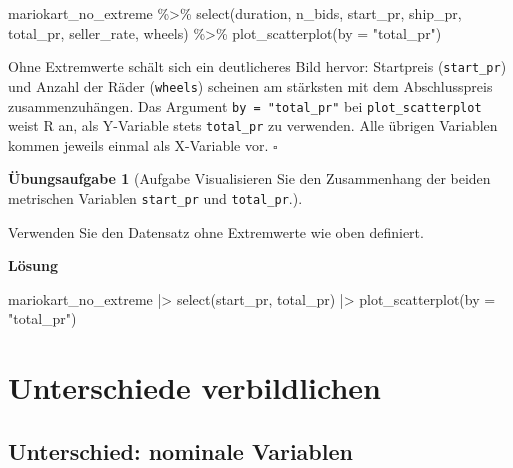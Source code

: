 \documentclass[
  letterpaper,
]{scrbook}
\newenvironment{Shaded}{\begin{snugshade}}{\end{snugshade}}
\newcommand{\AttributeTok}[1]{\textcolor[rgb]{0.40,0.45,0.13}{#1}}
\newcommand{\FunctionTok}[1]{\textcolor[rgb]{0.28,0.35,0.67}{#1}}
\newcommand{\NormalTok}[1]{\textcolor[rgb]{0.00,0.23,0.31}{#1}}
\newcommand{\SpecialCharTok}[1]{\textcolor[rgb]{0.37,0.37,0.37}{#1}}
\newcommand{\StringTok}[1]{\textcolor[rgb]{0.13,0.47,0.30}{#1}}
\theoremstyle{definition}
\newtheorem{exercise}{Übungsaufgabe}[chapter]
\theoremstyle{definition}
\theoremstyle{definition}
\theoremstyle{remark}
\begin{document}
\begin{Shaded}
\begin{Highlighting}[]
\NormalTok{mariokart\_no\_extreme }\SpecialCharTok{\%\textgreater{}\%} 
  \FunctionTok{select}\NormalTok{(duration, n\_bids, start\_pr, }
\NormalTok{         ship\_pr, total\_pr, }
\NormalTok{         seller\_rate, wheels) }\SpecialCharTok{\%\textgreater{}\%} 
  \FunctionTok{plot\_scatterplot}\NormalTok{(}\AttributeTok{by =} \StringTok{"total\_pr"}\NormalTok{)}
\end{Highlighting}
\end{Shaded}

Ohne Extremwerte schält sich ein deutlicheres Bild hervor: Startpreis
(\texttt{start\_pr}) und Anzahl der Räder (\texttt{wheels}) scheinen am
stärksten mit dem Abschlusspreis zusammenzuhängen. Das Argument
\texttt{by\ =\ "total\_pr"} bei \texttt{plot\_scatterplot} weist R an,
als Y-Variable stets \texttt{total\_pr} zu verwenden. Alle übrigen
Variablen kommen jeweils einmal als X-Variable vor. \(\square\)

\begin{exercise}[Aufgabe Visualisieren Sie den Zusammenhang der beiden
metrischen Variablen \texttt{start\_pr} und
\texttt{total\_pr}.]\protect\hypertarget{exr-zsmnhang-metrisch}{}\label{exr-zsmnhang-metrisch}

Verwenden Sie den Datensatz ohne Extremwerte wie oben definiert.

\textbf{Lösung}

\begin{Shaded}
\begin{Highlighting}[]
\NormalTok{mariokart\_no\_extreme }\SpecialCharTok{|\textgreater{}} 
  \FunctionTok{select}\NormalTok{(start\_pr, total\_pr) }\SpecialCharTok{|\textgreater{}} 
  \FunctionTok{plot\_scatterplot}\NormalTok{(}\AttributeTok{by =} \StringTok{"total\_pr"}\NormalTok{)}
\end{Highlighting}
\end{Shaded}

\end{exercise}

\section{Unterschiede verbildlichen}\label{unterschiede-verbildlichen}

\subsection{Unterschied: nominale
Variablen}\label{unterschied-nominale-variablen}
\end{document}
